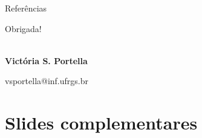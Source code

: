 \documentclass[8pt,mathserif,professionalfont]{beamer}
\begin{document}

\def\newblock{\hskip .9em plus .31em minus .05em}
     

\begin{frame}[allowframebreaks]{Referências}
   
\end{frame}


\begin{frame}[noframenumbering]
   \begin{center}
   	
   	 \medskip
   
      {\Huge Obrigada!}\\
      ~
      
      \textbf{Victória S. Portella}
      ~

      vsportella@inf.ufrgs.br\\
   
   \medskip
      
   \end{center}
    \begin{center}   	
    	
	\end{center}
  
\end{frame}

\section*{Slides complementares}
	
\end{document}
